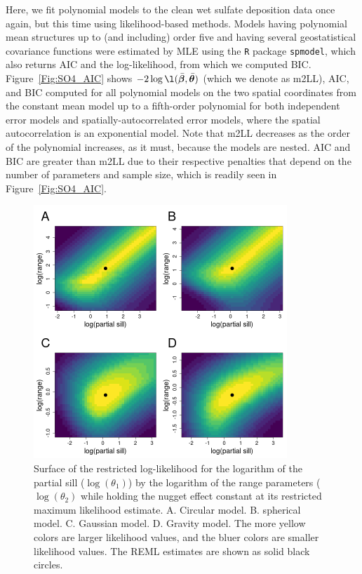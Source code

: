 \documentclass[12pt, titlepage]{article}
\begin{document}
Here, we fit polynomial models to the clean wet sulfate deposition data once again, but this time using likelihood-based methods.  Models having polynomial mean structures up to (and including) order five and having several geostatistical covariance functions were estimated by MLE using the \texttt{R} package \texttt{spmodel}, which also returns AIC and the log-likelihood, from which we computed BIC.  Figure~\ref{Fig:SO4_AIC} shows $-2\log\l(\bar{\boldsymbol{\beta}},\bar{\boldsymbol{\theta}})$ (which we denote as m2LL), AIC, and BIC computed for all polynomial models on the two spatial coordinates from the constant mean model up to a fifth-order polynomial for both independent error models and spatially-autocorrelated error models, where the spatial autocorrelation is an exponential model. Note that m2LL decreases as the order of the polynomial increases, as it must, because the models are nested. AIC and BIC are greater than m2LL due to their respective penalties that depend on the number of parameters and sample size, which is readily seen in Figure~\ref{Fig:SO4_AIC}. 
\begin{figure}[H]
  \begin{center}
	    \includegraphics[width=.8\linewidth]{SO4_Viz_m2LL_covParms}
  \end{center}
  \caption{Surface of the restricted log-likelihood for the logarithm of the partial sill ($\log(\theta_{1})$) by the logarithm of the range parameters ($\log(\theta_{2})$ while holding the nugget effect constant at its restricted maximum likelihood estimate. A. Circular model. B. spherical model. C. Gaussian model. D. Gravity model.  The more yellow colors are larger likelihood values, and the bluer colors are smaller likelihood values. The REML estimates are shown as solid black circles. \label{Fig:SO4_psill_range}}
\end{figure} 
\end{document}
